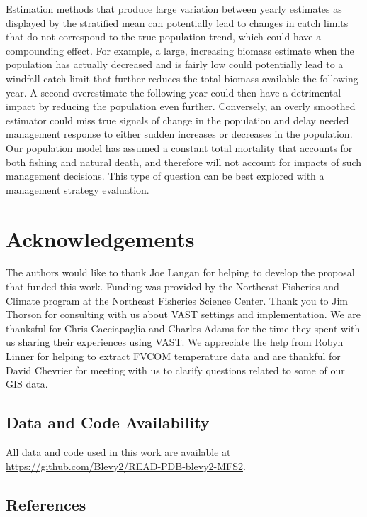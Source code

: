 \documentclass[
  12pt,
]{article}
\begin{document}
Estimation methods that produce large variation between yearly estimates as displayed by the stratified mean can potentially lead to changes in catch limits that do not correspond to the true population trend, which could have a compounding effect. For example, a large, increasing biomass estimate when the population has actually decreased and is fairly low could potentially lead to a windfall catch limit that further reduces the total biomass available the following year. A second overestimate the following year could then have a detrimental impact by reducing the population even further. Conversely, an overly smoothed estimator could miss true signals of change in the population and delay needed management response to either sudden increases or decreases in the population. Our population model has assumed a constant total mortality that accounts for both fishing and natural death, and therefore will not account for impacts of such management decisions. This type of question can be best explored with a management strategy evaluation.

\section{Acknowledgements}

The authors would like to thank Joe Langan for helping to develop the proposal that funded this work. Funding was provided by the Northeast Fisheries and Climate program at the Northeast Fisheries Science Center. Thank you to Jim Thorson for consulting with us about VAST settings and implementation. We are thanksful for Chris Cacciapaglia and Charles Adams for the time they spent with us sharing their experiences using VAST. We appreciate the help from Robyn Linner for helping to extract FVCOM temperature data and are thankful for David Chevrier for meeting with us to clarify questions related to some of our GIS data.

\hypertarget{data-and-code-availability}{%
\subsection{Data and Code Availability}\label{data-and-code-availability}}

All data and code used in this work are available at \url{https://github.com/Blevy2/READ-PDB-blevy2-MFS2}.

\hypertarget{references}{%
\subsection{References}\label{references}}
\end{document}
